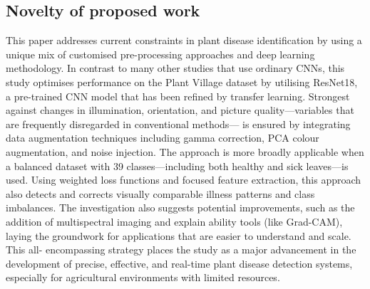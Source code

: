 \documentclass[conference]{IEEEtran}
\begin{document}
\subsection{\textbf{Novelty of proposed work}}

This paper addresses current constraints in plant disease identification by using a unique mix of customised pre-processing approaches and deep learning methodology. In contrast to many other studies that use ordinary CNNs, this study optimises performance on the Plant Village dataset by utilising ResNet18, a pre-trained CNN model that has been refined by transfer learning. Strongest against changes in illumination, orientation, and picture quality—variables that are frequently disregarded in conventional methods— is ensured by integrating data augmentation techniques including gamma correction, PCA colour augmentation, and noise injection. The approach is more broadly applicable when a balanced dataset with 39 classes—including both healthy and sick leaves—is used. Using weighted loss functions and focused feature extraction, this approach also detects and corrects visually comparable illness patterns and class imbalances. The investigation also suggests potential improvements, such as the addition of multispectral imaging and explain ability tools (like Grad-CAM), laying the groundwork for applications that are easier to understand and scale. This all- encompassing strategy places the study as a major advancement in the development of precise, effective, and real-time plant disease detection systems, especially for agricultural environments with limited resources.
\end{document}
